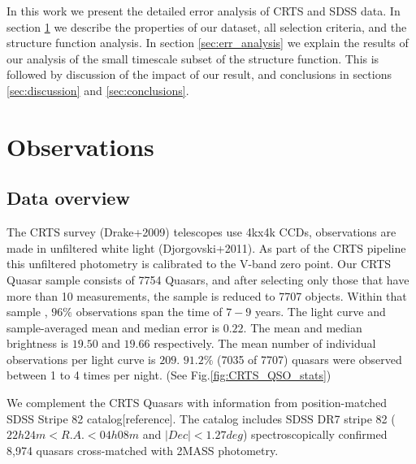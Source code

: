 \documentclass[a4paper,fleqn,usenatbib]{mnras}
\begin{document}
In this work we present the detailed error analysis of CRTS and SDSS data. In section \ref{sec:obs} we describe the properties of our dataset, all selection criteria, and the structure function analysis.  In section \ref{sec:err_analysis} we explain the results of our analysis of the small timescale subset of the structure function. This is followed by discussion of the impact of our result, and conclusions in sections \ref{sec:discussion} and \ref{sec:conclusions}.
 

\section{Observations}
\label{sec:obs}

\subsection{Data overview}

The CRTS survey (Drake+2009) telescopes use 4kx4k CCDs, observations are made in unfiltered white light (Djorgovski+2011).  As part of the CRTS pipeline this unfiltered photometry is calibrated to the V-band zero point. Our CRTS Quasar sample consists of 7754 Quasars, and after selecting only those that have more than 10 measurements, the sample is reduced to 7707 objects. Within that sample , $96 \% $ observations span the time of $7-9$ years. The light curve and sample-averaged mean and median error is $0.22$. The mean and median brightness is $19.50$ and  $19.66$ respectively. The mean number of individual observations per light curve  is $209$. $91.2\%$ (7035 of 7707) quasars were observed between 1 to 4 times per night.  (See Fig.\ref{fig:CRTS_QSO_stats})

We complement the CRTS Quasars with information from position-matched SDSS Stripe 82 catalog[reference]. The catalog includes SDSS DR7 stripe 82 ($22h 24m < R.A. < 04h 08m$ and $| Dec | < 1.27 deg$) spectroscopically confirmed  8,974 quasars cross-matched with 2MASS photometry. 
\end{document}

